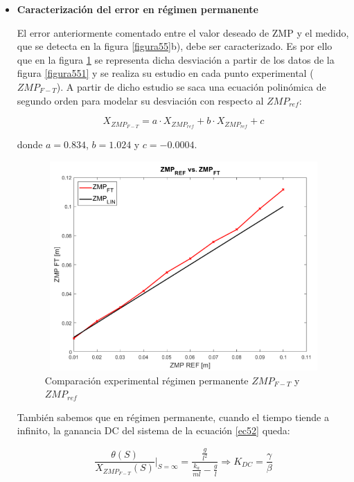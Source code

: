 \begin{itemize}

\item \textbf{Caracterización del error en régimen permanente}

El error anteriormente comentado entre el valor deseado de ZMP y el medido, que se detecta en la figura \ref{figura55}b), debe ser caracterizado. Es por ello que en la figura \ref{figura58} se representa dicha desviación a partir de los datos de la figura \ref{figura551} y se realiza su estudio en cada punto experimental ($ZMP_{F-T}$). A partir de dicho estudio se saca una ecuación polinómica de segundo orden para modelar su desviación con respecto al $ZMP_{ref}$:

\begin{equation}
X_{ZMP_{F-T}} = a \cdot X_{ZMP_{ref}} + b \cdot X_{ZMP_{ref}} + c
\label{ec53}
\end{equation}

donde $a=0.834$, $b=1.024$ y $c=-0.0004$.

\begin{figure}[H]
\centering
\includegraphics[width=13cm, height=8cm]{imagenes/apartado_5/58_evol_zmp_ft_vs_ref}
\caption{Comparación experimental régimen permanente $ZMP_{F-T}$ y $ZMP_{ref}$}
\label{figura58}
\end{figure}

También sabemos que en régimen permanente, cuando el tiempo tiende a infinito, la ganancia DC del sistema de la ecuación \ref{ec52} queda:

\begin{equation}
\frac{\theta(S)}{X_{ZMP_{F-T}}(S)}|_{S=\infty}=\frac{\frac{g}{l^2}}{\frac{k_a}{ml} - \frac{g}{l}}\Rightarrow K_{DC}=\frac{\gamma}{\beta}
\label{ec54}
\end{equation}


\end{itemize}
